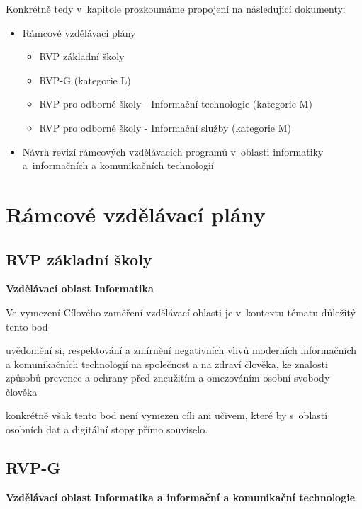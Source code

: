Konkrétně tedy v~kapitole prozkoumáme propojení na následující dokumenty:

\begin{itemize}
\item Rámcové vzdělávací plány
	\begin{itemize}
    \item RVP základní školy \citep{rvp-zs}
    \item RVP-G (kategorie L) \citep{rvp-g}
    \item RVP pro odborné školy - Informační technologie \citep{rvp-it} (kategorie M)
    \item RVP pro odborné školy - Informační služby\citep{rvp-is} (kategorie M)
	\end{itemize}
\item Návrh revizí rámcových vzdělávacích programů v oblasti informatiky a informačních a komunikačních technologií \citep{revize}
\end{itemize}

\section{Rámcové vzdělávací plány}

\subsection{RVP základní školy}

\textbf{Vzdělávací oblast Informatika}

Ve vymezení Cílového zaměření vzdělávací oblasti je v~kontextu tématu důležitý tento bod

\begin{displayquote}
uvědomění si, respektování a zmírnění negativních vlivů moderních informačních a komunikačních technologií na společnost a na zdraví člověka, ke znalosti způsobů prevence a ochrany před zneužitím a omezováním osobní svobody člověka
\end{displayquote}

konkrétně však tento bod není vymezen cíli ani učivem, které by s~oblastí osobních dat a digitální stopy přímo souviselo.

\subsection{RVP-G}

\textbf{Vzdělávací oblast Informatika a informační a komunikační technologie}

